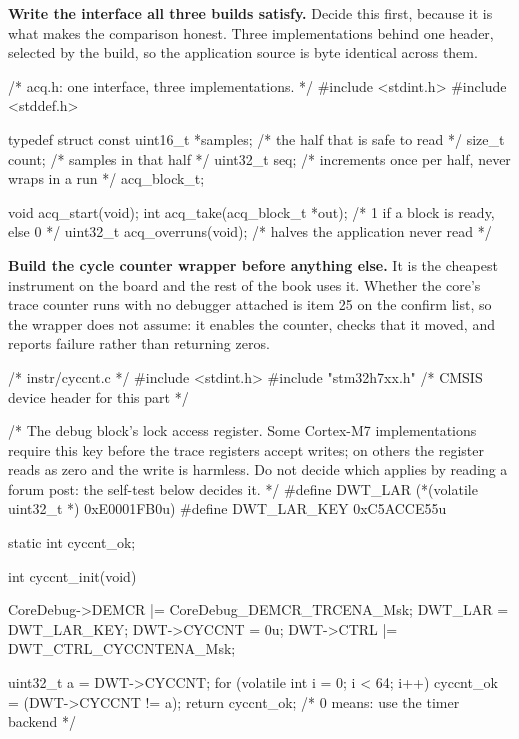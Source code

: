 \begin{steps}
\item \textbf{Write the interface all three builds satisfy.} Decide this first,
because it is what makes the comparison honest. Three implementations behind one
header, selected by the build, so the application source is byte identical
across them.
\begin{ccode}
/* acq.h: one interface, three implementations. */
#include <stdint.h>
#include <stddef.h>

typedef struct {
    const uint16_t *samples;   /* the half that is safe to read */
    size_t          count;     /* samples in that half */
    uint32_t        seq;       /* increments once per half, never wraps in a run */
} acq_block_t;

void     acq_start(void);
int      acq_take(acq_block_t *out);   /* 1 if a block is ready, else 0 */
uint32_t acq_overruns(void);           /* halves the application never read */
\end{ccode}

\item \textbf{Build the cycle counter wrapper before anything else.} It is the
cheapest instrument on the board and the rest of the book uses it. Whether the
core's trace counter runs with no debugger attached is item 25 on the confirm
list, so the wrapper does not assume: it enables the counter, checks that it
moved, and reports failure rather than returning zeros.
\begin{ccode}
/* instr/cyccnt.c */
#include <stdint.h>
#include "stm32h7xx.h"          /* CMSIS device header for this part */

/* The debug block's lock access register. Some Cortex-M7 implementations
   require this key before the trace registers accept writes; on others the
   register reads as zero and the write is harmless. Do not decide which
   applies by reading a forum post: the self-test below decides it. */
#define DWT_LAR (*(volatile uint32_t *) 0xE0001FB0u)
#define DWT_LAR_KEY 0xC5ACCE55u

static int cyccnt_ok;

int cyccnt_init(void)
{
    CoreDebug->DEMCR |= CoreDebug_DEMCR_TRCENA_Msk;
    DWT_LAR = DWT_LAR_KEY;
    DWT->CYCCNT = 0u;
    DWT->CTRL  |= DWT_CTRL_CYCCNTENA_Msk;

    uint32_t a = DWT->CYCCNT;
    for (volatile int i = 0; i < 64; i++) { }
    cyccnt_ok = (DWT->CYCCNT != a);
    return cyccnt_ok;                 /* 0 means: use the timer backend */
}


\end{ccode}
\end{steps}
